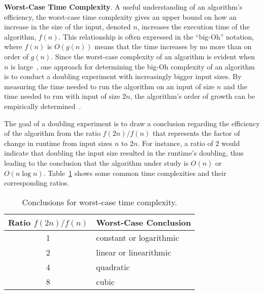 {\bf Worst-Case Time Complexity}. A useful understanding of an algorithm's efficiency, the worst-case time complexity
gives an upper bound on how an increase in the size of the input, denoted $n$, increases the execution time of the
algorithm, $f(n)$.  This relationship is often expressed in the ``big-Oh'' notation, where $f(n)$ is $O(g(n))$ means
that the time increases by no more than on order of $g(n)$. Since the worst-case complexity of an algorithm is evident
when $n$ is large~\cite{mcgeoch2012}, one approach for determining the big-Oh complexity of an algorithm is to conduct
a doubling experiment with increasingly bigger input sizes. By measuring the time needed to run the algorithm on an
input of size $n$ and the time needed to run with input of size $2n$, the algorithm's order of growth can be
empirically determined~\cite{mcgeoch2012,sedgewick1998}.

The goal of a doubling experiment is to draw a conclusion regarding the efficiency of the algorithm from the ratio
$f(2n)/f(n)$ that represents the factor of change in runtime from input sizes $n$ to $2n$. For instance, a ratio of $2$
would indicate that doubling the input size resulted in the runtime's doubling, thus leading to the conclusion that the
algorithm under study is $O(n)$ or $O(n\log n)$.  Table~\ref{table:ratios} shows some common time complexities and their
corresponding ratios.

\begin{table}[t]

  \begin{center}

    \begin{tabular}{c|l}
      Ratio $f(2n)/f(n)$ & Worst-Case Conclusion              \\ \hline
      1                  & constant or logarithmic \\
      2                  & linear or linearithmic  \\
      4                  & quadratic               \\
      8                  & cubic                   \\
    \end{tabular}

  \end{center}
  \vspace*{-.25in}

  \caption{Conclusions for worst-case time complexity.}~\label{table:ratios}
  \vspace*{-.35in}

\end{table}

